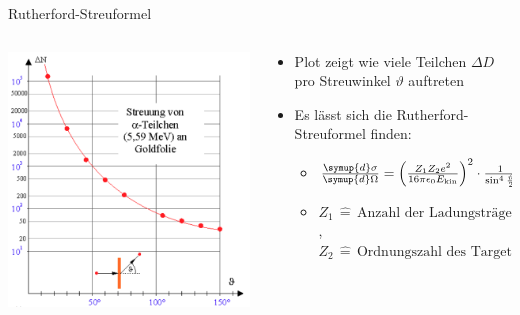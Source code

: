 \documentclass[aspectratio=1610, 9pt]{beamer}
\begin{document}
\begin{frame}{Rutherford-Streuformel}
  \begin{columns}
    \begin{column}{0.4\textwidth}
      \includegraphics[width=\textwidth]{images/Streuung.png}
    \end{column}
    \begin{column}{0.6\textwidth}
      \begin{itemize}
        \item{Plot zeigt wie viele Teilchen $\Delta D$ pro Streuwinkel $\vartheta$ auftreten}
        \item{Es lässt sich die Rutherford-Streuformel finden:}
        \begin{itemize}
        \item{$ \frac{\symup{d} \sigma}{\symup{d} \Omega } = \left( \frac{Z_\text{1}Z_\text{2} e^2}{16 \pi \epsilon_\text{0} E_\text{kin}} \right)^2 \cdot \frac{1}{\sin^4{\frac{\vartheta}{2}}} $}
        \item{$Z_\text{1} \,\hat{=}  \,\text{Anzahl der Ladungsträgern des gestreuten Teilchen} $, $Z_\text{2} \,\hat{=}  \,\text{Ordnungszahl des Targets} $}
        \end{itemize}
      \end{itemize}
    \end{column}
  \end{columns}
\end{frame}
\end{document}
